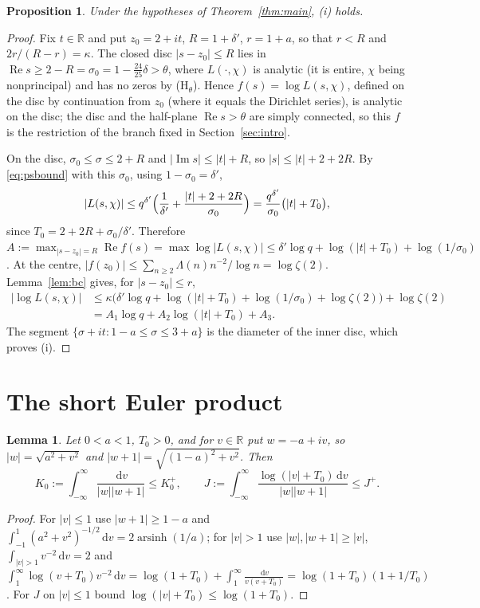 \documentclass[11pt]{article}
\newtheorem{proposition}[theorem]{Proposition}
\newtheorem{lemma}[theorem]{Lemma}
\theoremstyle{definition}
\theoremstyle{remark}
\numberwithin{equation}{section}
\newcommand{\R}{\mathbb R}
\newcommand{\Rea}{\operatorname{Re}}
\newcommand{\Ima}{\operatorname{Im}}
\newcommand{\asinh}{\operatorname{arsinh}}
\newcommand{\dd}{\,\mathrm{d}}
\begin{document}
\begin{proposition}\label{prop:bc}
Under the hypotheses of Theorem~\ref{thm:main}, \textup{(i)} holds.
\end{proposition}
\begin{proof}
Fix $t\in\R$ and put $z_0=2+it$, $R=1+\delta'$, $r=1+a$, so that $r<R$ and $2r/(R-r)=\kappa$. The closed disc $|s-z_0|\le R$ lies in $\Rea s\ge2-R=\sigma_0=1-\tfrac{24}{25}\delta>\theta$, where $L(\cdot,\chi)$ is analytic (it is entire, $\chi$ being nonprincipal) and has no zeros by (H$_\theta$). Hence $f(s)=\log L(s,\chi)$, defined on the disc by continuation from $z_0$ (where it equals the Dirichlet series), is analytic on the disc; the disc and the half-plane $\Rea s>\theta$ are simply connected, so this $f$ is the restriction of the branch fixed in Section~\ref{sec:intro}.

On the disc, $\sigma_0\le\sigma\le2+R$ and $|\Ima s|\le|t|+R$, so $|s|\le|t|+2+2R$. By \eqref{eq:psbound} with this $\sigma_0$, using $1-\sigma_0=\delta'$,
\[
 |L(s,\chi)|\le q^{\delta'}\Bigl(\frac1{\delta'}+\frac{|t|+2+2R}{\sigma_0}\Bigr)=\frac{q^{\delta'}}{\sigma_0}\bigl(|t|+T_0\bigr),
\]
since $T_0=2+2R+\sigma_0/\delta'$. Therefore $A:=\max_{|s-z_0|=R}\Rea f(s)=\max\log|L(s,\chi)|\le\delta'\log q+\log(|t|+T_0)+\log(1/\sigma_0)$. At the centre, $|f(z_0)|\le\sum_{n\ge2}\Lambda(n)n^{-2}/\log n=\log\zeta(2)$. Lemma~\ref{lem:bc} gives, for $|s-z_0|\le r$,
\begin{align*}
 |\log L(s,\chi)|&\le\kappa\bigl(\delta'\log q+\log(|t|+T_0)+\log(1/\sigma_0)+\log\zeta(2)\bigr)+\log\zeta(2)\\
 &=A_1\log q+A_2\log(|t|+T_0)+A_3 .
\end{align*}
The segment $\{\sigma+it:1-a\le\sigma\le3+a\}$ is the diameter of the inner disc, which proves (i).
\end{proof}

\section{The short Euler product}\label{sec:perron}

\begin{lemma}\label{lem:KJ}
Let $0<a<1$, $T_0>0$, and for $v\in\R$ put $w=-a+iv$, so $|w|=\sqrt{a^2+v^2}$ and $|w+1|=\sqrt{(1-a)^2+v^2}$. Then
\[
 K_0:=\int_{-\infty}^{\infty}\frac{\dd v}{|w||w+1|}\le K_0^+,\qquad J:=\int_{-\infty}^{\infty}\frac{\log(|v|+T_0)\dd v}{|w||w+1|}\le J^+ .
\]
\end{lemma}
\begin{proof}
For $|v|\le1$ use $|w+1|\ge1-a$ and $\int_{-1}^{1}(a^2+v^2)^{-1/2}\dd v=2\asinh(1/a)$; for $|v|>1$ use $|w|,|w+1|\ge|v|$, $\int_{|v|>1}v^{-2}\dd v=2$ and $\int_1^\infty\log(v+T_0)v^{-2}\dd v=\log(1+T_0)+\int_1^\infty\frac{\dd v}{v(v+T_0)}=\log(1+T_0)(1+1/T_0)$. For $J$ on $|v|\le1$ bound $\log(|v|+T_0)\le\log(1+T_0)$.
\end{proof}
\end{document}
